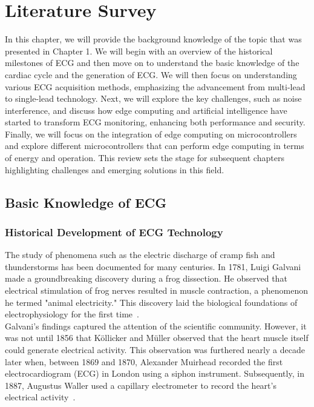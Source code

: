 
\chapter{Literature Survey}
\label{chap:literature_survey}

In this chapter, we will provide the background knowledge of the topic that was presented in Chapter 1. We will begin with an overview of the historical milestones of ECG and then move on to understand the basic knowledge of the cardiac cycle and the generation of ECG. We will then focus on understanding various ECG acquisition methods, emphasizing the advancement from multi-lead to single-lead technology. Next, we will explore the key challenges, such as noise interference, and discuss how edge computing and artificial intelligence have started to transform ECG monitoring, enhancing both performance and security. Finally, we will focus on the integration of edge computing on microcontrollers and explore different microcontrollers that can perform edge computing in terms of energy and operation. This review sets the stage for subsequent chapters highlighting challenges and emerging solutions in this field.

\section{Basic Knowledge of ECG}
\vspace{1em}
\subsection{Historical Development of ECG Technology}
\vspace{1em}
The study of phenomena such as the electric discharge of cramp fish and thunderstorms has been documented for many centuries. In 1781, Luigi Galvani made a groundbreaking discovery during a frog dissection. He observed that electrical stimulation of frog nerves resulted in muscle contraction, a phenomenon he termed "animal electricity." This discovery laid the biological foundations of electrophysiology for the first time~\cite{yang2015}.\\


\noindent Galvani's findings captured the attention of the scientific community. However, it was not until 1856 that Köllicker and Müller observed that the heart muscle itself could generate electrical activity. This observation was furthered nearly a decade later when, between 1869 and 1870, Alexander Muirhead recorded the first electrocardiogram (ECG) in London using a siphon instrument. Subsequently, in 1887, Augustus Waller used a capillary electrometer to record the heart's electrical activity~\cite{johansson2001}.\\

